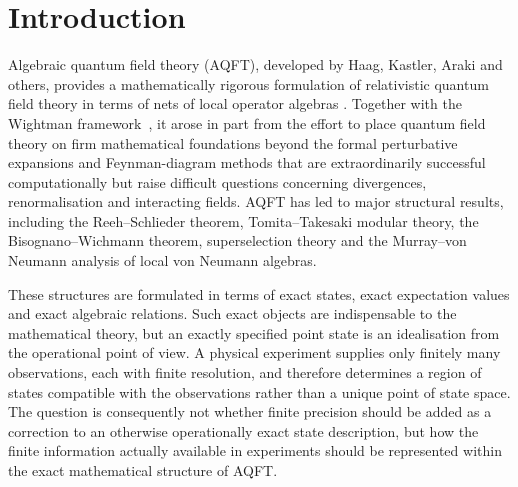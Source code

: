 \documentclass[11pt]{article}
\begin{document}
\begin{abstract}
Finally, limiting projection faces and their canonical conjugation
actions characterize minimality and finiteness and recover the
Murray--von Neumann classification of factors. For the
Type~$\mathrm{III}$ factors characteristic of local AQFT, the absence of
minimal projections and pure normal states is reflected in the absence
of singleton nonzero projection faces; in Type~$\mathrm{II}_1$ factors,
homogeneous parcel counting reconstructs the normalized trace and
projection equivalence. Thus IAQFT provides an operational state description appropriate to
finite experimental information, while retaining exact AQFT states as
ideal limiting objects; within this framework it distinguishes
structures robust at finite precision, those acquiring a finite-precision
operational interpretation, and those recovered only in the exact limit.
\end{abstract}

\section{Introduction}
\label{sec:intro}

Algebraic quantum field theory (AQFT), developed by Haag, Kastler, Araki
and others, provides a mathematically rigorous formulation of relativistic
quantum field theory in terms of nets of local operator algebras
\cite{HaagKastler,Araki,haag2012local}. Together with the Wightman
framework~\cite{Wightman1956,streaterWightman}, it arose in part from the
effort to place quantum field theory on firm mathematical foundations
beyond the formal perturbative expansions and Feynman-diagram methods that
are extraordinarily successful computationally but raise difficult
questions concerning divergences, renormalisation and interacting fields.
AQFT has led to major structural results, including the Reeh--Schlieder
theorem, Tomita--Takesaki modular theory, the Bisognano--Wichmann theorem,
superselection theory and the Murray--von Neumann analysis of local
von Neumann algebras.

These structures are formulated in terms of exact states, exact
expectation values and exact algebraic relations. Such exact objects are
indispensable to the mathematical theory, but an exactly specified point
state is an idealisation from the operational point of view. A physical
experiment supplies only finitely many observations, each with finite
resolution, and therefore determines a region of states compatible with
the observations rather than a unique point of state space. The question
is consequently not whether finite precision should be added as a
correction to an otherwise operationally exact state description, but how
the finite information actually available in experiments should be
represented within the exact mathematical structure of AQFT.
\end{document}
